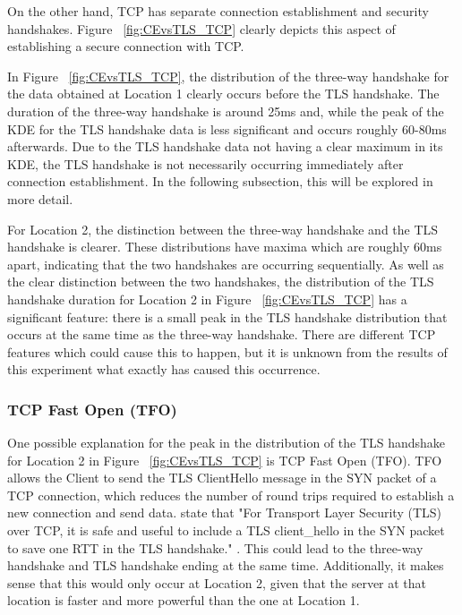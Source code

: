 \documentclass{l4proj}
\begin{document}
On the other hand, TCP has separate connection establishment and security handshakes. Figure ~\ref{fig:CEvsTLS_TCP} clearly depicts this aspect of establishing a secure connection with TCP. 

In Figure ~\ref{fig:CEvsTLS_TCP}, the distribution of the three-way handshake for the data obtained at Location 1 clearly occurs before the TLS handshake. The duration of the three-way handshake is around 25ms and, while the peak of the KDE for the TLS handshake data is less significant and occurs roughly 60-80ms afterwards. Due to the TLS handshake data not having a clear maximum in its KDE, the TLS handshake is not necessarily occurring immediately after connection establishment. In the following subsection, this will be explored in more detail.

For Location 2, the distinction between the three-way handshake and the TLS handshake is clearer. These distributions have maxima which are roughly 60ms apart, indicating that the two handshakes are occurring sequentially. As well as the clear distinction between the two handshakes, the distribution of the TLS handshake duration for Location 2 in Figure ~\ref{fig:CEvsTLS_TCP} has a significant feature: there is a small peak in the TLS handshake distribution that occurs at the same time as the three-way handshake. There are different TCP features which could cause this to happen, but it is unknown from the results of this experiment what exactly has caused this occurrence.

\subsubsection{TCP Fast Open (TFO)} One possible explanation for the peak in the distribution of the TLS handshake for Location 2 in Figure ~\ref{fig:CEvsTLS_TCP} is TCP Fast Open (TFO). TFO allows the Client to send the TLS ClientHello message in the SYN packet of a TCP connection, which reduces the number of round trips required to establish a new connection and send data. \citet{Cheng2014} state that "For Transport Layer Security (TLS) over TCP, it is safe and useful to include a TLS client\_hello in the SYN packet to save one RTT in the TLS handshake." \citep{Cheng2014}. This could lead to the three-way handshake and TLS handshake ending at the same time. Additionally, it makes sense that this would only occur at Location 2, given that the server at that location is faster and more powerful than the one at Location 1.
\end{document}
